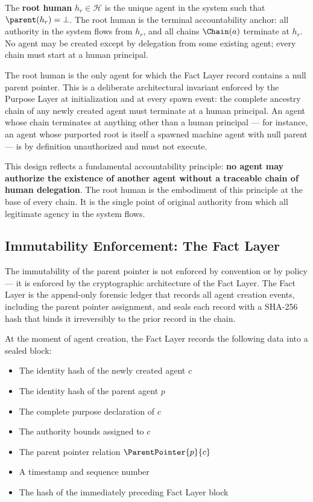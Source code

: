 \begin{definition}
\label{def:root_human}
The \textbf{root human} $h_r \in \mathcal{H}$ is the unique agent in the system such that $\parent(h_r) = \bot$. The root human is the terminal accountability anchor: all authority in the system flows from $h_r$, and all chains $\Chain(a)$ terminate at $h_r$. No agent may be created except by delegation from some existing agent; every chain must start at a human principal.
\end{definition}

The root human is the only agent for which the Fact Layer record contains a null parent pointer. This is a deliberate architectural invariant enforced by the Purpose Layer at initialization and at every spawn event: the complete ancestry chain of any newly created agent must terminate at a human principal. An agent whose chain terminates at anything other than a human principal — for instance, an agent whose purported root is itself a spawned machine agent with null parent — is by definition unauthorized and must not execute.

This design reflects a fundamental accountability principle: \textbf{no agent may authorize the existence of another agent without a traceable chain of human delegation}. The root human is the embodiment of this principle at the base of every chain. It is the single point of original authority from which all legitimate agency in the system flows.

\subsection{Immutability Enforcement: The Fact Layer}
\label{sec:fact_layer_immutability}

The immutability of the parent pointer is not enforced by convention or by policy — it is enforced by the cryptographic architecture of the Fact Layer. The Fact Layer is the append-only forensic ledger that records all agent creation events, including the parent pointer assignment, and seals each record with a SHA-256 hash that binds it irreversibly to the prior record in the chain.

At the moment of agent creation, the Fact Layer records the following data into a sealed block:
\begin{itemize}
    \item The identity hash of the newly created agent $c$
    \item The identity hash of the parent agent $p$
    \item The complete purpose declaration of $c$
    \item The authority bounds assigned to $c$
    \item The parent pointer relation $\ParentPointer{p}{c}$
    \item A timestamp and sequence number
    \item The hash of the immediately preceding Fact Layer block
\end{itemize}

